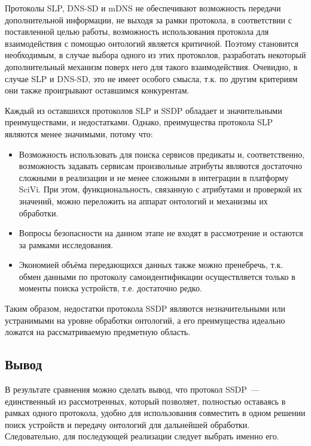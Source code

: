 Протоколы SLP, DNS-SD и mDNS не обеспечивают возможность передачи дополнительной информации, не выходя за рамки протокола, в соответствии с поставленной целью работы, возможность использования протокола для взаимодействия с помощью онтологий является критичной.
Поэтому становится необходимым, в случае выбора одного из этих протоколов, разработать некоторый дополнительный механизм поверх него для такого взаимодействия.
Очевидно, в случае SLP и DNS-SD, это не имеет особого смысла, т.к.
по другим критериям они также проигрывают оставшимся конкурентам.

Каждый из оставшихся протоколов SLP и SSDP обладает и значительными преимуществами, и недостатками.
Однако, преимущества протокола SLP являются менее значимыми, потому что:
\begin{itemize}
	\item Возможность использовать для поиска сервисов предикаты и, соответственно, возможность задавать сервисам произвольные атрибуты являются достаточно сложными в реализации и не менее сложными в интеграции в платформу SciVi.
	При этом, функциональность, связанную с атрибутами и проверкой их значений, можно переложить на аппарат онтологий и механизмы их обработки.
	\item Вопросы безопасности на данном этапе не входят в рассмотрение и остаются за рамками исследования.
	\item Экономией объёма передающихся данных также можно пренебречь, т.к. обмен данными по протоколу самоидентификации осуществляется только в моменты поиска устройств, т.е. достаточно редко.
\end{itemize}

Таким образом, недостатки протокола SSDP являются незначительными или устранимыми на уровне обработки онтологий, а его преимущества идеально ложатся на рассматриваемую предметную область.

\subsection {Вывод}

В результате сравнения можно сделать вывод, что протокол SSDP~--- единственный из рассмотренных, который позволяет, полностью оставаясь в рамках одного протокола, удобно для использования совместить в одном решении поиск устройств и передачу онтологий для дальнейшей обработки.
Следовательно, для последующей реализации следует выбрать именно его.
